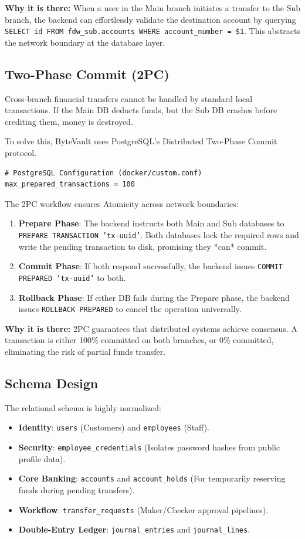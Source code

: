 \textbf{Why it is there:} When a user in the Main branch initiates a transfer to the Sub branch, the backend can effortlessly validate the destination account by querying \texttt{SELECT id FROM fdw\_sub.accounts WHERE account\_number = \$1}. This abstracts the network boundary at the database layer.

\subsection{Two-Phase Commit (2PC)}
Cross-branch financial transfers cannot be handled by standard local transactions. If the Main DB deducts funds, but the Sub DB crashes before crediting them, money is destroyed. 

To solve this, ByteVault uses PostgreSQL's Distributed Two-Phase Commit protocol.

\begin{lstlisting}[style=bash]
# PostgreSQL Configuration (docker/custom.conf)
max_prepared_transactions = 100
\end{lstlisting}

The 2PC workflow ensures Atomicity across network boundaries:
\begin{enumerate}
    \item \textbf{Prepare Phase}: The backend instructs both Main and Sub databases to \texttt{PREPARE TRANSACTION 'tx-uuid'}. Both databases lock the required rows and write the pending transaction to disk, promising they *can* commit.
    \item \textbf{Commit Phase}: If both respond successfully, the backend issues \texttt{COMMIT PREPARED 'tx-uuid'} to both.
    \item \textbf{Rollback Phase}: If either DB fails during the Prepare phase, the backend issues \texttt{ROLLBACK PREPARED} to cancel the operation universally.
\end{enumerate}

\textbf{Why it is there:} 2PC guarantees that distributed systems achieve consensus. A transaction is either 100\% committed on both branches, or 0\% committed, eliminating the risk of partial funds transfer.

\subsection{Schema Design}
The relational schema is highly normalized:
\begin{itemize}
    \item \textbf{Identity}: \texttt{users} (Customers) and \texttt{employees} (Staff).
    \item \textbf{Security}: \texttt{employee\_credentials} (Isolates password hashes from public profile data).
    \item \textbf{Core Banking}: \texttt{accounts} and \texttt{account\_holds} (For temporarily reserving funds during pending transfers).
    \item \textbf{Workflow}: \texttt{transfer\_requests} (Maker/Checker approval pipelines).
    \item \textbf{Double-Entry Ledger}: \texttt{journal\_entries} and \texttt{journal\_lines}.
\end{itemize}
